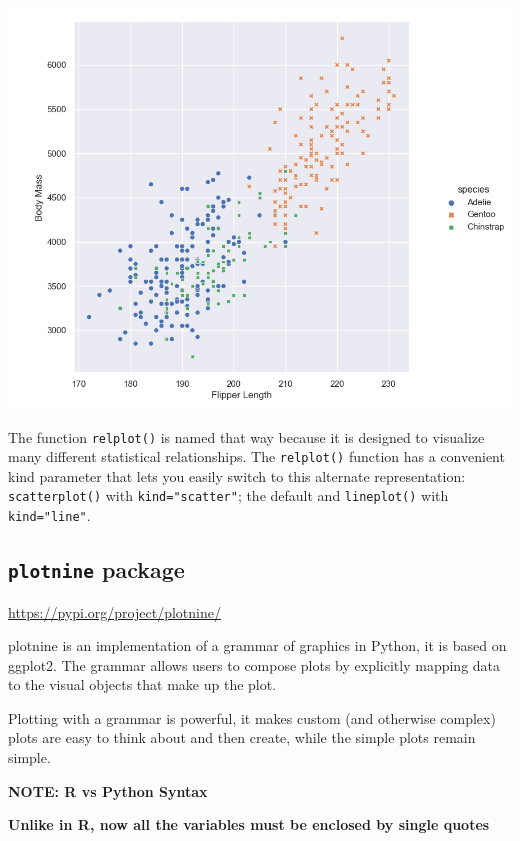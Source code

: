 \documentclass[]{book}
\begin{document}
\begin{center}\includegraphics[width=0.9\linewidth]{fig/Viz_chap/2_seaborn} \end{center}

The function \texttt{relplot()} is named that way because it is designed to visualize many different statistical relationships. The \texttt{relplot()} function has a convenient kind parameter that lets you easily switch to this alternate representation:
\texttt{scatterplot()} with \texttt{kind="scatter"}; the default and \texttt{lineplot()} with \texttt{kind="line"}.

\hypertarget{plotnine-package}{%
\subsection{\texorpdfstring{\texttt{plotnine} package}{plotnine package}}\label{plotnine-package}}

\url{https://pypi.org/project/plotnine/}

plotnine is an implementation of a grammar of graphics in Python, it is based on ggplot2. The grammar allows users to compose plots by explicitly mapping data to the visual objects that make up the plot.

Plotting with a grammar is powerful, it makes custom (and otherwise complex) plots are easy to think about and then create, while the simple plots remain simple.

\textbf{NOTE: R vs Python Syntax}

\textbf{Unlike in R, now all the variables must be enclosed by single quotes}
\end{document}
